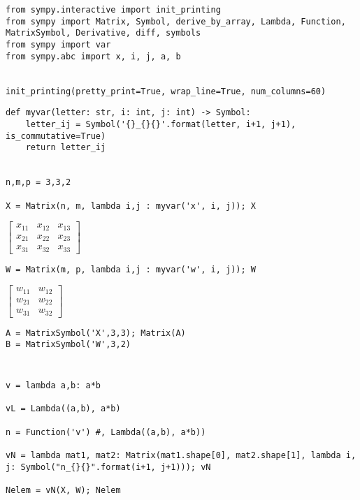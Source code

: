 \documentclass[
]{article}
\author{}
\date{}
\begin{document}
\begin{verbatim}
from sympy.interactive import init_printing
from sympy import Matrix, Symbol, derive_by_array, Lambda, Function, MatrixSymbol, Derivative, diff, symbols
from sympy import var
from sympy.abc import x, i, j, a, b


init_printing(pretty_print=True, wrap_line=True, num_columns=60)
\end{verbatim}

\begin{verbatim}
def myvar(letter: str, i: int, j: int) -> Symbol:
    letter_ij = Symbol('{}_{}{}'.format(letter, i+1, j+1), is_commutative=True)
    return letter_ij


n,m,p = 3,3,2

X = Matrix(n, m, lambda i,j : myvar('x', i, j)); X
\end{verbatim}

\(\displaystyle \left[\begin{matrix}x_{11} & x_{12} & x_{13}\\x_{21} & x_{22} & x_{23}\\x_{31} & x_{32} & x_{33}\end{matrix}\right]\)

\begin{verbatim}
W = Matrix(m, p, lambda i,j : myvar('w', i, j)); W
\end{verbatim}

\(\displaystyle \left[\begin{matrix}w_{11} & w_{12}\\w_{21} & w_{22}\\w_{31} & w_{32}\end{matrix}\right]\)

\begin{verbatim}
A = MatrixSymbol('X',3,3); Matrix(A)
B = MatrixSymbol('W',3,2)
\end{verbatim}

\begin{verbatim}

\end{verbatim}

\begin{verbatim}

\end{verbatim}

\begin{verbatim}
v = lambda a,b: a*b

vL = Lambda((a,b), a*b)

n = Function('v') #, Lambda((a,b), a*b))

vN = lambda mat1, mat2: Matrix(mat1.shape[0], mat2.shape[1], lambda i, j: Symbol("n_{}{}".format(i+1, j+1))); vN

Nelem = vN(X, W); Nelem
\end{verbatim}
\end{document}
